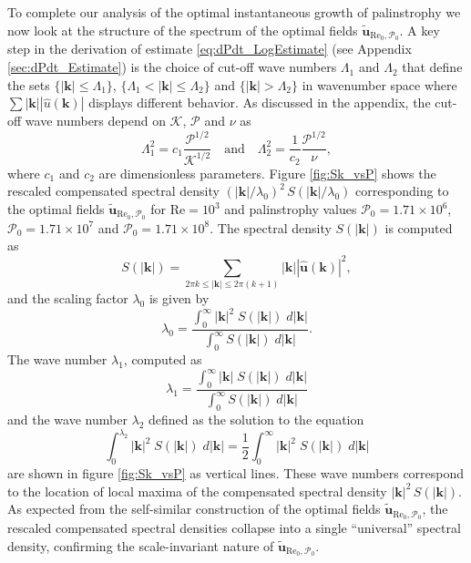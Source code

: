 \documentclass[11pt]{article}
\def\P{{\mathcal{P}}}
\def\K{{\mathcal{K}}}
\newcommand{\uvec}{\mathbf{u}}
\newcommand{\kvec}{\mathbf{k}}
\newcommand{\uhat}{\widehat{u}}
\newcommand{\Reyn}{\textrm{Re}}
\newcommand{\tuvecRP}{\widetilde{\mathbf{u}}_{\Reyn_0,\P_0}}
\begin{document}
To complete our analysis of the optimal instantaneous growth of palinstrophy we now look at the structure of the spectrum of the optimal fields $\tuvecRP$. 
A key step in the derivation of estimate \eqref{eq:dPdt_LogEstimate} (see Appendix \ref{sec:dPdt_Estimate}) is the choice of cut-off wave numbers $\Lambda_1$ and $\Lambda_2$ that define the sets $\{ |\kvec| \leq \Lambda_1 \}$, $\{\Lambda_1 < |\kvec| \leq \Lambda_2 \}$ and $\{ |\kvec| > \Lambda_2 \}$ in wavenumber space where $\sum | \kvec | | \uhat(\kvec) |$ displays different behavior.
As discussed in the appendix, the cut-off wave numbers depend on  $\K$, $\P$ and $\nu$ as
\begin{equation*}
\Lambda_1^2 = c_1\frac{\P^{1/2}}{\K^{1/2}}\quad\mbox{and}\quad 
\Lambda_2^2 = \frac{1}{c_2}\frac{\P^{1/2}}{\nu},
\end{equation*}
where $c_1$ and $c_2$ are dimensionless parameters.
Figure \ref{fig:Sk_vsP} shows the rescaled compensated spectral density $(|\kvec|/\lambda_0)^2 \, S(|\kvec|/\lambda_0)$ corresponding to the optimal fields $\tuvecRP$ for $\Reyn = 10^3$ and palinstrophy values $\P_0 = 1.71\times 10^6$, $\P_0 = 1.71\times 10^7$ and $\P_0 = 1.71\times 10^8$. The spectral density $S( |\kvec| )$ is computed as
\[
S(|\kvec|) = \sum_{2\pi k \leq | \kvec | \leq 2\pi(k+1)} |\kvec| |\widehat{\uvec}(\kvec)|^2,
\]
and the scaling factor $\lambda_0$ is given by
\begin{equation}\label{eq:Lambda_0}
\lambda_0 = \frac{\int_0^\infty |\kvec|^2 \; S( |\kvec| ) \; d |\kvec| }
{\int_0^\infty S(|\kvec|)\;d|\kvec|}.
\end{equation}
The wave number $\lambda_1$, computed as
\begin{equation}\label{eq:Lambda_1}
\lambda_1 = \frac{\int_0^\infty |\kvec| \; S( |\kvec| ) \; d |\kvec| }
{\int_0^\infty S(|\kvec|)\;d|\kvec|}
\end{equation}
and the wave number $\lambda_2$ defined as the solution to the equation
\begin{equation}\label{eq:Lambda_2}
\int_0^{\lambda_2} |\kvec|^2 \; S(|\kvec|) \; d|\kvec| = \frac{1}{2}\int_0^{\infty} |\kvec|^2 \; S(|\kvec|) \; d|\kvec| 
\end{equation}
are shown in figure \ref{fig:Sk_vsP} as vertical lines.
These wave numbers correspond to the location of local maxima of the compensated spectral density $|\kvec|^2 \,  S(|\kvec|)$.
As expected from the self-similar construction of the optimal fields $\tuvecRP$, the rescaled compensated spectral densities collapse into a single ``universal'' spectral density, confirming the scale-invariant nature of $\tuvecRP$. 
\end{document}
